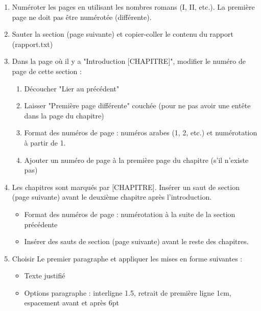 \documentclass[11pt, a4paper]{article}
\begin{document}
\begin{enumerate}
	\item Numéroter les pages en utilisant les nombres romans (I, II, etc.). La première page ne doit pas être numérotée (différente).
	\item Sauter la section (page suivante) et copier-coller le contenu du rapport (rapport.txt)
	\item Dans la page où il y a "Introduction [CHAPITRE]", modifier le numéro de page de cette section : 
	\begin{multicols}{2}
	\begin{enumerate}
		\item Découcher "Lier au précédent" 
		\item Laisser "Première page différente" couchée (pour ne pas avoir une entête dans la page du chapitre) 
		\item Format des numéros de page : numéros arabes (1, 2, etc.) et numérotation à partir de 1.
		\item Ajouter un numéro de page à la première page du chapitre (s'il n'existe pas)
	\end{enumerate}
	\end{multicols}
	
	\item Les chapitres sont marqués par [CHAPITRE]. Insérer un saut de section (page suivante) avant le deuxième chapitre après l'introduction. 
	\begin{itemize}
		\item Format des numéros de page : numérotation à la suite de la section précédente
		\item Insérer des sauts de section (page suivante) avant le reste des chapitres. 
	\end{itemize}

	\item Choisir Le premier paragraphe et appliquer les mises en forme suivantes : 
	\begin{itemize}
		\item Texte justifié 
		\item Options paragraphe : interligne 1.5, retrait de première ligne 1cm, espacement avant et après 6pt
	\end{itemize}


\end{enumerate}
\end{document}
